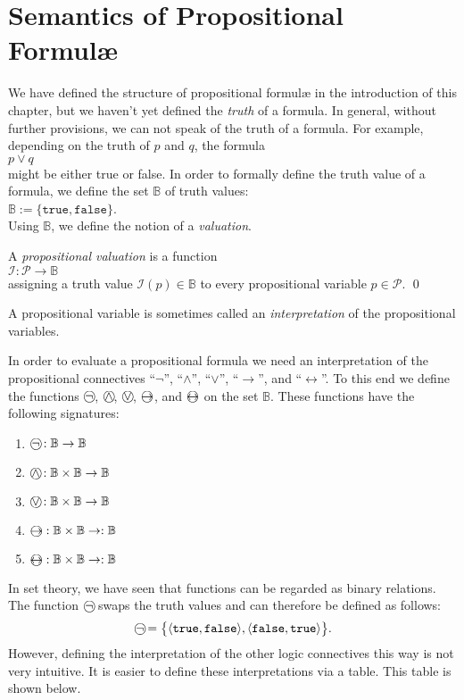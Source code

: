 \section{Semantics of Propositional {Formul\ae}}
We have defined the structure of propositional {formul\ae} in the introduction of this chapter, but we
haven't yet defined the \emph{truth} of a formula.  In general, without further provisions, we can
not speak of the truth of a formula.   For example, depending on the truth of $p$ and $q$, the formula
\\[0.2cm]
\hspace*{1.3cm}
$p \vee q$
\\[0.2cm]
might be either true or false.  In order to formally define the truth value of a formula, we define
the set $\mathbb{B}$ of truth values:  \\[0.2cm] 
\hspace*{1.3cm} $\mathbb{B} := \{ \mathtt{true}, \mathtt{false} \}$. \\[0.2cm]
Using $\mathbb{B}$, we define the notion of a \emph{valuation}.

\begin{Definition}
A  \emph{propositional valuation} is a function 
\\[0.2cm]
\hspace*{1.3cm} 
$\mathcal{I}:\mathcal{P} \rightarrow \mathbb{B}$ \\[0.2cm]
assigning a truth value  $\mathcal{I}(p) \in \mathbb{B}$ to every propositional variable
 $p\in \mathcal{P}$.
 \qed
\end{Definition}
A propositional variable is sometimes called an  \emph{interpretation} of the propositional variables.

In order to evaluate a propositional formula we need an interpretation of the propositional connectives
``$\neg$'', ``$\wedge$'', ``$\vee$'', ``$\rightarrow$'', and
``$\leftrightarrow$''.   To this end we define the functions
$\circneg$, $\circwedge$, $\circvee$, $\circright$, and $\circleftright$
on the set $\mathbb{B}$.  These functions have the following signatures:
\begin{enumerate}
\item $\circneg: \mathbb{B} \rightarrow \mathbb{B}$
\item $\circwedge: \mathbb{B} \times \mathbb{B} \rightarrow \mathbb{B}$
\item $\circvee: \mathbb{B} \times \mathbb{B} \rightarrow \mathbb{B}$
\item $\circright: \mathbb{B} \times \mathbb{B} \rightarrow: \mathbb{B}$
\item $\circleftright: \mathbb{B} \times \mathbb{B} \rightarrow: \mathbb{B}$
\end{enumerate}
In set theory, we have seen that functions can be regarded as binary relations.
The function $\circneg$ swaps the truth values and can therefore be defined as follows:
\[ \circneg = \bigl\{ \pair(\texttt{true},\texttt{false}), \pair(\texttt{false},\texttt{true}) \bigr\}. \]
However, defining the interpretation of the other logic connectives this way is not very intuitive.
It is easier to define these interpretations via a table.  This table is shown below. 

